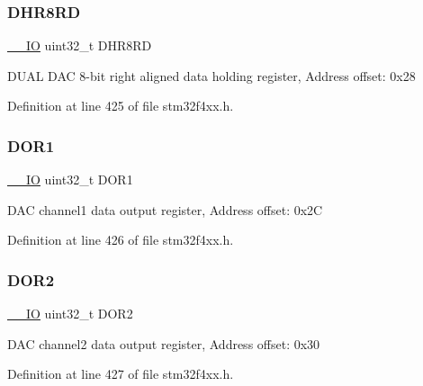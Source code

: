 \subsubsection{\texorpdfstring{D\+H\+R8\+RD}{DHR8RD}}
{\footnotesize\ttfamily \hyperlink{group___c_m_s_i_s__core__definitions_gaec43007d9998a0a0e01faede4133d6be}{\+\_\+\+\_\+\+IO} uint32\+\_\+t D\+H\+R8\+RD}

D\+U\+AL D\+AC 8-\/bit right aligned data holding register, Address offset\+: 0x28 

Definition at line 425 of file stm32f4xx.\+h.

\mbox{\label{struct_d_a_c___type_def_aa710505be03a41981c35bacc7ce20746}} 
\subsubsection{\texorpdfstring{D\+O\+R1}{DOR1}}
{\footnotesize\ttfamily \hyperlink{group___c_m_s_i_s__core__definitions_gaec43007d9998a0a0e01faede4133d6be}{\+\_\+\+\_\+\+IO} uint32\+\_\+t D\+O\+R1}

D\+AC channel1 data output register, Address offset\+: 0x2C 

Definition at line 426 of file stm32f4xx.\+h.

\mbox{\label{struct_d_a_c___type_def_aba9fb810b0cf6cbc1280c5c63be2418b}} 
\subsubsection{\texorpdfstring{D\+O\+R2}{DOR2}}
{\footnotesize\ttfamily \hyperlink{group___c_m_s_i_s__core__definitions_gaec43007d9998a0a0e01faede4133d6be}{\+\_\+\+\_\+\+IO} uint32\+\_\+t D\+O\+R2}

D\+AC channel2 data output register, Address offset\+: 0x30 

Definition at line 427 of file stm32f4xx.\+h.

\mbox{\label{struct_d_a_c___type_def_af6aca2bbd40c0fb6df7c3aebe224a360}} 
